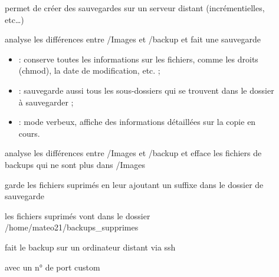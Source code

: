 \documentclass[letterpaper,10pt,french]{sphinxmanual}
\begin{document}
\label{\detokenize{17-transferer-fichiers:rsync-sauvegardes-sur-un-serveur-distant}}\begin{description}
\item[{}] \leavevmode
permet de créer des sauvegardes sur un serveur distant (incrémentielles, etc…)

\item[{}] \leavevmode
analyse les différences entre /Images et /backup et fait une sauvegarde
\begin{itemize}
\item {} 
 : conserve toutes les informations sur les fichiers, comme les droits (chmod), la date de modification, etc. ;

\item {} 
 : sauvegarde aussi tous les sous-dossiers qui se trouvent dans le dossier à sauvegarder ;

\item {} 
 : mode verbeux, affiche des informations détaillées sur la copie en cours.

\end{itemize}

\item[{}] \leavevmode
analyse les différences entre /Images et /backup et efface les fichiers de backups qui ne sont plus dans /Images

\item[{}] \leavevmode
garde les fichiers suprimés en leur ajoutant un suffixe dans le dossier de sauvegarde

\item[{}] \leavevmode
les fichiers suprimés vont dans le dossier /home/mateo21/backups\_supprimes

\item[{}] \leavevmode
fait le backup sur un ordinateur distant via ssh

\item[{}] \leavevmode
avec un n° de port custom

\end{description}
\end{document}
